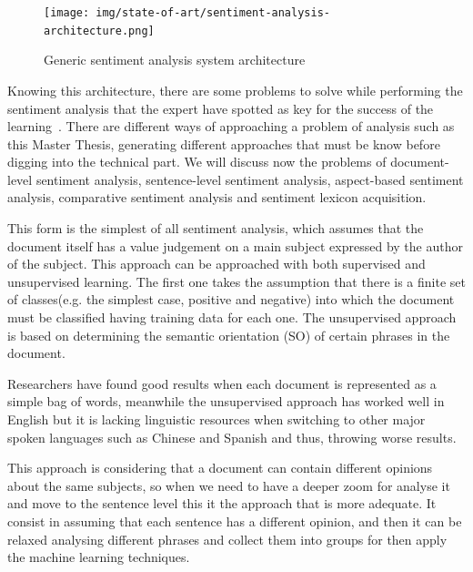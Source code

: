 \begin{figure}[!htp]
    \centering
    \texttt{[image: img/state-of-art/sentiment-analysis-architecture.png]}

    \caption{Generic sentiment analysis system architecture~\cite{feldman2013techniques}}
    \label{fig:sentiment-analysis-architecture}
\end{figure}


Knowing this architecture, there are some problems to solve while performing the sentiment analysis that the expert have spotted as key for the success of the learning~\cite{feldman2013techniques}. There are different ways of approaching a problem of analysis such as this Master Thesis, generating different approaches that must be know before digging into the technical part. We will discuss now the problems of document-level sentiment analysis, sentence-level sentiment analysis, aspect-based sentiment analysis, comparative sentiment analysis and sentiment lexicon acquisition.

This form is the simplest of all sentiment analysis, which assumes that the document itself has a value judgement on a main subject expressed by the author of the subject. This approach can be approached with both supervised and unsupervised learning. The first one takes the assumption that there is a finite set of classes(e.g. the simplest case, positive and negative) into which the document must be classified having training data for each one. The unsupervised approach is based on determining the semantic orientation (SO) of certain phrases in the document.

Researchers have found good results when each document is represented as a simple bag of words, meanwhile the unsupervised approach has worked well in English but it is lacking linguistic resources when switching to other major spoken languages such as Chinese and Spanish and thus, throwing worse results.

This approach is considering that a document can contain different opinions about the same subjects, so when we need to have a deeper zoom for analyse it and move to the sentence level this it the approach that is more adequate. It consist in assuming that each sentence has a different opinion, and then it can be relaxed analysing different phrases and collect them into groups for then apply the machine learning techniques.

